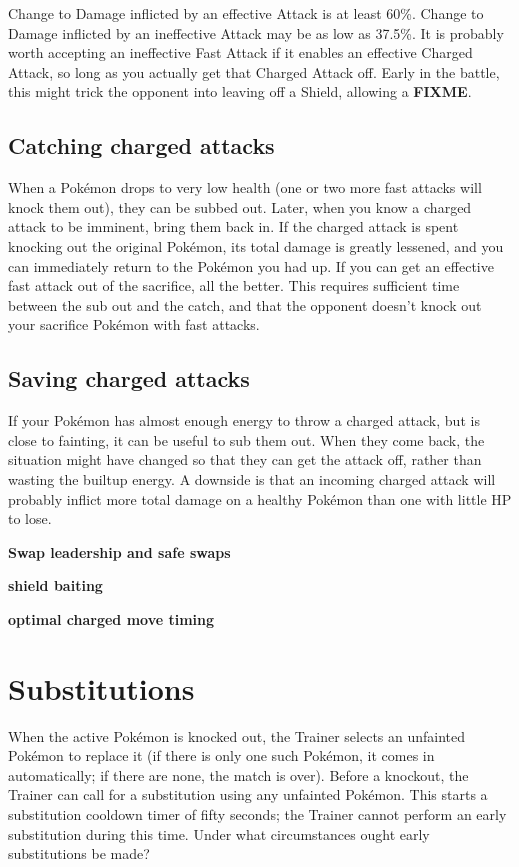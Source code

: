 Change to Damage inflicted by an effective Attack is at least 60\%.
Change to Damage inflicted by an ineffective Attack may be as
 low as 37.5\%.
It is probably worth accepting an ineffective Fast Attack if it
 enables an effective Charged Attack, so long as you actually
 get that Charged Attack off.
Early in the battle, this might trick the opponent into leaving
 off a Shield, allowing a \textbf{FIXME}.

\subsection{Catching charged attacks}
When a Pokémon drops to very low health (one or two more fast attacks will knock
 them out), they can be subbed out.
Later, when you know a charged attack to be imminent, bring them back in.
If the charged attack is spent knocking out the original Pokémon, its total
 damage is greatly lessened, and you can immediately return to the Pokémon
 you had up.
If you can get an effective fast attack out of the sacrifice, all the better.
This requires sufficient time between the sub out and the catch, and that the
 opponent doesn't knock out your sacrifice Pokémon with fast attacks.

\subsection{Saving charged attacks}
If your Pokémon has almost enough energy to throw a charged attack, but is close to fainting, it can be useful to sub them out.
When they come back, the situation might have changed so that they can get the attack off,
 rather than wasting the builtup energy.
A downside is that an incoming charged attack will probably inflict more total
 damage on a healthy Pokémon than one with little HP to lose.

\textbf{Swap leadership and safe swaps}

\textbf{shield baiting}

\textbf{optimal charged move timing}

\section{Substitutions}
\label{sec:substitutions}
When the active Pokémon is knocked out, the Trainer selects an unfainted
  Pokémon to replace it (if there is only one such Pokémon, it comes in
  automatically; if there are none, the match is over).
Before a knockout, the Trainer can call for a substitution using any
  unfainted Pokémon.
This starts a substitution cooldown timer of fifty seconds; the Trainer
  cannot perform an early substitution during this time.
Under what circumstances ought early substitutions be made?

